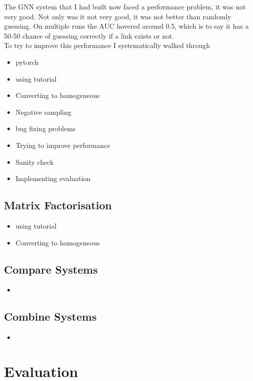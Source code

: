 \documentclass{l4proj}
\begin{document}
The GNN system that I had built now faced a performance problem, it was not very good. Not only was it not very good, it was not better than randomly guessing. On multiple runs the AUC hovered around 0.5, which is to say it has a 50-50 chance of guessing correctly if a link exists or not. \\

To try to improve this performance I systematically walked through

\begin{itemize}
    \item pytorch
    \item using tutorial
    \item Converting to homogeneous
    \item Negative sampling
    \item bug fixing problems
    \item Trying to improve performance
    \item Sanity check
    \item Implementing evaluation
\end{itemize}

\section{Matrix Factorisation}
\begin{itemize}
    \item using tutorial
    \item Converting to homogeneous
\end{itemize}

\section{Compare Systems}
\begin{itemize}
    \item 
\end{itemize}

\section{Combine Systems}
\begin{itemize}
    \item 
\end{itemize}

\chapter{Evaluation} 
\end{document}
